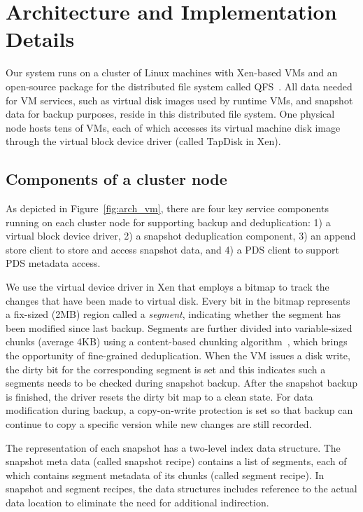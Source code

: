 \section{Architecture and Implementation Details}
\label{sect:architecture}

Our system runs on a cluster of Linux machines with Xen-based VMs and
an open-source package for the distributed file system  called QFS~\cite{QFS}. 
All data needed for VM services, such as virtual disk images used by runtime VMs,
and snapshot data for backup purposes, reside in this distributed file system. 
One physical node hosts tens of VMs, each of which accesses its virtual machine disk image through the
virtual block device driver (called TapDisk\cite{Warfield2005} in Xen).

\subsection{ Components of a cluster node } 
As depicted in Figure~\ref{fig:arch_vm}, 
there are four key service components running on each cluster
node  for supporting backup and deduplication: 
1) a virtual block device driver, 2) a snapshot deduplication component,
3) an append store client to store  and access snapshot data,
and 4)  a PDS client to support PDS metadata access. 

We use the virtual device driver in Xen that employs a bitmap to track the changes 
that have been made to virtual disk.
Every bit in the bitmap represents a fix-sized (2MB) region called a \textit{segment}, indicating whether the segment
has been modified since last backup. 
Segments are further divided into variable-sized chunks (average 4KB) 
using a content-based chunking algorithm~\cite{frame05}, 
which brings the opportunity of fine-grained deduplication.
When the VM issues a disk write, the dirty bit for the corresponding segment is set
and this indicates such a segments needs to be checked during snapshot backup. 
After the snapshot backup is finished, the driver resets the dirty bit map to a clean state.
For data modification during backup, a copy-on-write protection is set so that backup can continue to
copy  a specific version while new changes are still recorded.

The representation of each snapshot has  a two-level index data structure.
The snapshot meta data (called snapshot recipe) contains a list of segments, each of which contains segment
metadata of its chunks (called segment recipe).
In snapshot and segment recipes, 
the data structures  includes reference to the actual data location to eliminate the need for additional indirection.

